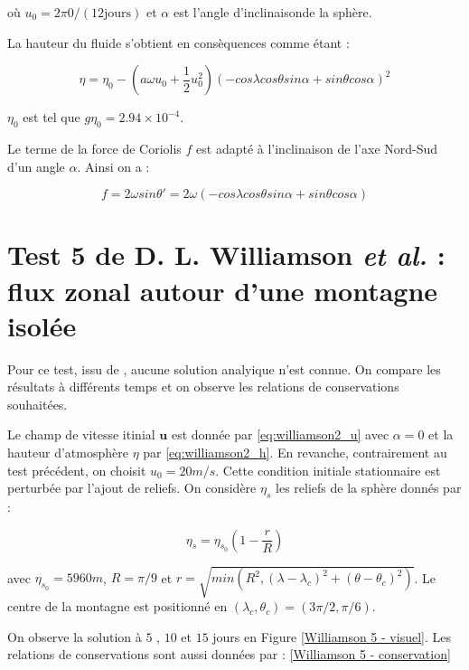 où $u_0 = 2 \pi 0 / (12 \text{jours} )$ et $\alpha$ est l'angle d'inclinaisonde  la sphère.

La hauteur du fluide s'obtient en consèquences comme étant :

\begin{equation}
\eta = \eta_0 - \left( a \omega u_0 + \dfrac{1}{2}u_0^2 \right) \left( -cos \lambda cos \theta sin \alpha + sin \theta cos \alpha \right)^2
\label{eq:williamson2_h}
\end{equation}

$\eta_0$ est tel que $g \eta_0 = 2.94 \times 10^{-4}$. 

Le terme de la force de Coriolis $f$ est adapté à l'inclinaison de l'axe Nord-Sud d'un angle $\alpha$. Ainsi on a :

$$ f = 2 \omega sin \theta' = 2 \omega \left( -cos \lambda cos \theta sin \alpha + sin \theta cos \alpha \right)$$





\section{Test 5 de D. L. Williamson \textit{et al.} : flux zonal autour d'une montagne isolée}

Pour ce test, issu de \cite{Williamson1992}, aucune solution analyique n'est connue. On compare les résultats à différents temps et on observe les relations de conservations souhaitées.

Le champ de vitesse itinial $\mathbf{u}$ est donnée par \eqref{eq:williamson2_u} avec $\alpha=0$ et la hauteur d'atmosphère $\eta$ par \eqref{eq:williamson2_h}. En revanche, contrairement au test précédent, on choisit $u_0=20m/s$.
Cette condition initiale stationnaire est perturbée par l'ajout de reliefs. On considère $\eta_s$ les reliefs de la sphère donnés par :

\begin{equation}
\eta_s = \eta_{s_0} \left( 1 - \dfrac{r}{R} \right)
\end{equation}

avec $\eta_{s_0}=5960m$, $R=\pi/9$ et $r = \sqrt{min\left( R^2, \left( \lambda-\lambda_c \right)^2 + \left( \theta-\theta_c \right)^2 \right)}$.
Le centre de la montagne est positionné en $(\lambda_c, \theta_c) = (3\pi/2, \pi/6)$.

On observe la solution à $5$ , $10$ et $15$ jours en Figure \ref{Williamson 5 - visuel}. Les relations de conservations sont aussi données par : \ref{Williamson 5 - conservation}

